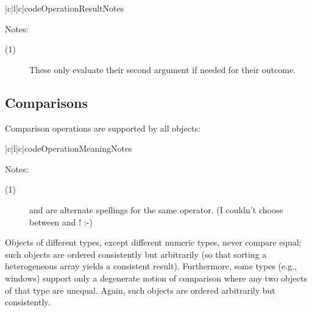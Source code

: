 \begin{tableiii}{|c|l|c|}{code}{Operation}{Result}{Notes}
\end{tableiii}

\noindent
Notes:

\begin{description}

\item[(1)]
These only evaluate their second argument if needed for their outcome.

\end{description}

\subsection{Comparisons}

Comparison operations are supported by all objects:

\begin{tableiii}{|c|l|c|}{code}{Operation}{Meaning}{Notes}
\end{tableiii}
\opindex{==} %

\noindent
Notes:

\begin{description}

\item[(1)]
\code{<>} and \code{!=} are alternate spellings for the same operator.
(I couldn't choose between \ABC{} and \C{}! :-)

\end{description}

Objects of different types, except different numeric types, never
compare equal; such objects are ordered consistently but arbitrarily
(so that sorting a heterogeneous array yields a consistent result).
Furthermore, some types (e.g., windows) support only a degenerate
notion of comparison where any two objects of that type are unequal.
Again, such objects are ordered arbitrarily but consistently.

